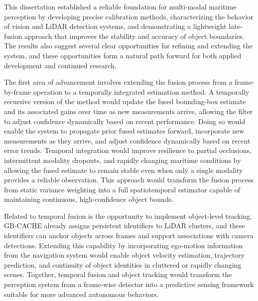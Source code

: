 \documentclass{erauthesis}
\begin{document}
This dissertation established a reliable foundation for multi-modal maritime perception by developing precise calibration methods, characterizing the behavior of vision and LiDAR detection systems, and demonstrating a lightweight late-fusion approach that improves the stability and accuracy of object boundaries. The results also suggest several clear opportunities for refining and extending the system, and these opportunities form a natural path forward for both applied development and continued research.


The first area of advancement involves extending the fusion process from a frame-by-frame operation to a temporally integrated estimation method. A temporally recursive version of the method would update the fused bounding-box estimate and its associated gains over time as new measurements arrive, allowing the filter to adjust confidence dynamically based on recent performance. Doing so would enable the system to propagate prior fused estimates forward, incorporate new measurements as they arrive, and adjust confidence dynamically based on recent error trends. Temporal integration would improve resilience to partial occlusions, intermittent modality dropouts, and rapidly changing maritime conditions by allowing the fused estimate to remain stable even when only a single modality provides a reliable observation. This approach would transform the fusion process from static variance weighting into a full spatiotemporal estimator capable of maintaining continuous, high-confidence object bounds.

Related to temporal fusion is the opportunity to implement object-level tracking. GB-CACHE already assigns persistent identifiers to LiDAR clusters, and these identifiers can anchor objects across frames and support associations with camera detections. Extending this capability by incorporating ego-motion information from the navigation system would enable object velocity estimation, trajectory prediction, and continuity of object identities in cluttered or rapidly changing scenes. Together, temporal fusion and object tracking would transform the perception system from a frame-wise detector into a predictive sensing framework suitable for more advanced autonomous behaviors.
\end{document}
